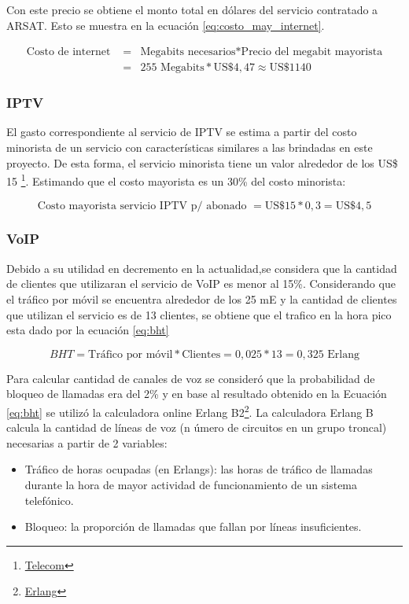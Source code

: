 \documentclass[11pt,a4paper]{article}
\begin{document}
Con este precio se obtiene el monto total en dólares del servicio contratado a ARSAT. 
Esto se muestra en la ecuación \ref{eq:costo_may_internet}.

\begin{eqnarray}
    \text{Costo de internet }&=&\text{Megabits necesarios}*\text{Precio del megabit mayorista}\\
    &=&255\text{ Megabits}*\text{US}\$4,47\approx\text{US}\$1140 \nonumber
    \label{eq:costo_may_internet}
\end{eqnarray}

\subsubsection{IPTV}

El gasto correspondiente al servicio de IPTV se estima a partir del costo minorista de un servicio con características similares a las brindadas en este proyecto. De esta forma, el servicio minorista tiene un valor alrededor de los US\$ 15 \footnote{\href{https://compraonline.telecom.com.ar/producto/telecomunicaciones/tv-por-cable}{Telecom}}. Estimando que el costo mayorista es un 30\% del costo minorista:

\begin{equation}
    \text{Costo mayorista servicio IPTV p/ abonado } = \text{US}\$ 15 * 0,3 = \text{US}\$ 4,5 
\end{equation}

\subsubsection{VoIP}

Debido a su utilidad en decremento en la actualidad,se considera que la cantidad de clientes que utilizaran el servicio de VoIP es menor al 15\%.
Considerando que el tráfico por móvil se encuentra alrededor de los 25 mE y la cantidad de clientes que utilizan el servicio es de 13 clientes, se obtiene que el trafico en la hora pico esta dado por la ecuación \ref{eq:bht}

\begin{equation}
    BHT = \text{Tráfico por móvil} * \text{Clientes} = 0,025 * 13 = 0,325 \text{ Erlang}
    \label{eq:bht}
\end{equation}

Para calcular cantidad de canales de voz se consideró que la probabilidad de bloqueo de
llamadas era del 2\% y en base al resultado obtenido en la Ecuación \ref{eq:bht} se utilizó la calculadora online Erlang B2\footnote{\href{https://www.erlang.com/calculator/erlb/}{Erlang}}. 
La calculadora Erlang B calcula la cantidad de líneas de voz (n úmero de circuitos en un grupo troncal) necesarias a partir de 2 variables:
\begin{itemize}
    \item Tráfico de horas ocupadas (en Erlangs): las horas de tráfico de llamadas durante la hora de mayor actividad de funcionamiento de un sistema telefónico.
\item Bloqueo: la proporción de llamadas que fallan por líneas insuficientes.
\end{itemize}
\end{document}
